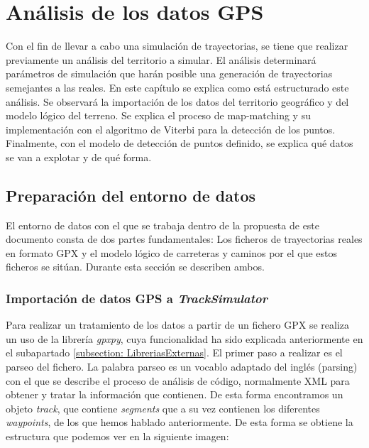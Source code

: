 \chapter{Análisis de los datos \ac{GPS}} 
Con el fin de llevar a cabo una simulación de trayectorias, se tiene que realizar previamente
un análisis del territorio a simular. El análisis determinará parámetros de simulación que 
harán posible una generación de trayectorias semejantes a las reales. En este capítulo 
se explica como está estructurado este análisis. Se observará la importación de los datos
del territorio geográfico y del modelo lógico del terreno. Se explica el proceso de 
map-matching y su implementación con el algoritmo de Viterbi para la detección de los 
puntos. Finalmente, con el modelo de detección de puntos definido, se explica qué 
datos se van a explotar y de qué forma.


\section{Preparación del entorno de datos}
El entorno de datos con el que se trabaja dentro de la propuesta de este documento 
consta de dos partes fundamentales: Los ficheros de trayectorias reales en formato
\ac{GPX} y el modelo lógico de carreteras y caminos por el que estos ficheros 
se sitúan. Durante esta sección se describen ambos.

\subsection{Importación de datos GPS a \textit{TrackSimulator}}
\label{section: ImportacionGPX}
Para realizar un tratamiento de los datos a partir de un fichero GPX se realiza un uso de la 
librería \textit{gpxpy}, cuya funcionalidad ha sido explicada anteriormente en el subapartado 
\ref{subsection: LibreriasExternas}. El primer paso a realizar es el parseo del fichero. 
La palabra parseo es un vocablo adaptado del inglés (parsing) con el que se describe el proceso 
de análisis de código, normalmente XML para obtener y tratar la información que contienen.
De esta forma encontramos un objeto \textit{track}, que contiene \textit{segments} que a su vez 
contienen los diferentes \textit{waypoints}, de los que hemos hablado anteriormente. De esta
forma se obtiene la estructura que podemos ver en la siguiente imagen:

